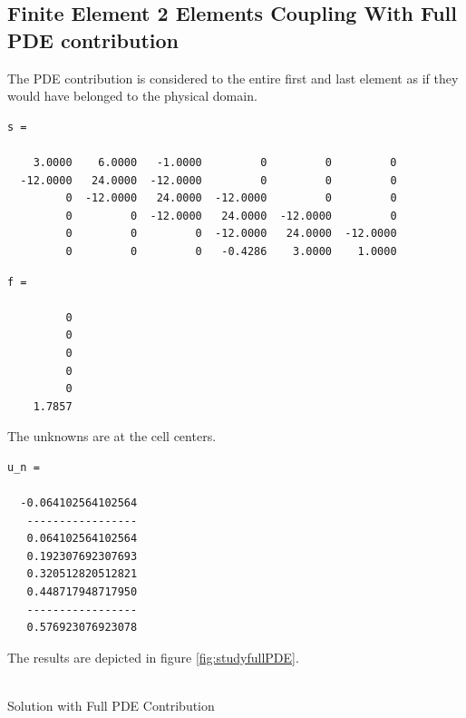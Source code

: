 \documentclass[a4paper,12pt]{article}
\makeatletter
\newenvironment{figurehere}
  {\def\@captype{figure}}
  {}
\makeatother
\begin{document}
\subsection{Finite Element 2 Elements Coupling With Full PDE contribution}
The PDE contribution is considered to the entire first and last element as if they would have belonged to the physical domain.
\begin{verbatim}
s =

    3.0000    6.0000   -1.0000         0         0         0
  -12.0000   24.0000  -12.0000         0         0         0
         0  -12.0000   24.0000  -12.0000         0         0
         0         0  -12.0000   24.0000  -12.0000         0
         0         0         0  -12.0000   24.0000  -12.0000
         0         0         0   -0.4286    3.0000    1.0000
\end{verbatim}
\begin{verbatim}
f =

         0
         0
         0
         0
         0
    1.7857
\end{verbatim}
The unknowns are at the cell centers.
\begin{verbatim}
u_n =

  -0.064102564102564
   -----------------
   0.064102564102564
   0.192307692307693
   0.320512820512821
   0.448717948717950
   -----------------
   0.576923076923078
\end{verbatim}
The results are depicted in figure \ref{fig:studyfullPDE}.
\begin{center}
\begin{figurehere} 
\\
\caption{Solution with Full PDE Contribution}\label{fig:studyfullPDE}
\end{figurehere}
\end{center}
\end{document}

